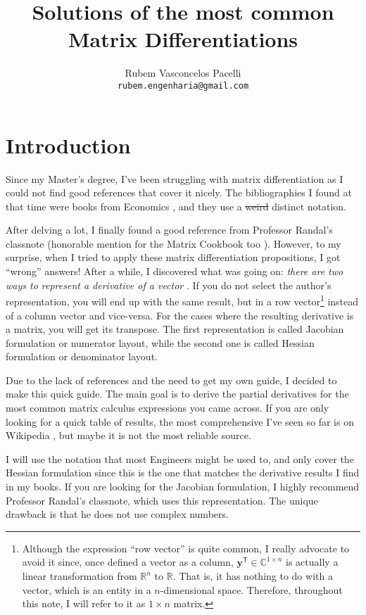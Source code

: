 \documentclass{article}
\title{\textbf{Solutions of the most common Matrix Differentiations}  \vspace{-.3cm}}
\author{Rubem Vasconcelos Pacelli\\
  {\tt rubem.engenharia@gmail.com}}
\affil{Department of Teleinformatics Engineering, Federal University of Ceará.\\Fortaleza, Ceará, Brazil. \vspace{-.5cm}}
\newcommand{\trans}{\mathsf{T}}
\begin{document}
\maketitle
\tableofcontents

\section{Introduction}
Since my Master's degree, I've been struggling with matrix differentiation as I could not find good references that cover it nicely. The bibliographies I found at that time were books from Economics \cite{dhrymes1978mathematics}, and they use a \st{weird} distinct notation.

After delving a lot, I finally found a good reference from Professor Randal's classnote \cite{barnes2006matrix} (honorable mention for the Matrix Cookbook too \cite{petersen2008matrix}). However, to my surprise, when I tried to apply these matrix differentiation propositions, I got ``wrong'' answers! After a while, I discovered what was going on: \emph{there are two ways to represent a derivative of a vector} \cite{Singh}. If you do not select the author's representation, you will end up with the same result, but in a row vector\footnote{Although the expression ``row vector'' is quite common, I really advocate to avoid it since, once defined a vector as a column, \(\mathbf{y}^{\trans} \in \mathbb{C}^{1\times n}\) is actually a linear transformation from \(\mathbb{R}^{n}\) to \(\mathbb{R}\). That is, it has nothing to do with a vector, which is an entity in a \(n\)-dimensional space. Therefore, throughout this note, I will refer to it as \(1\times n\) matrix.} instead of a column vector and vice-versa. For the cases where the resulting derivative is a matrix, you will get its transpose. The first representation is called Jacobian formulation or numerator layout, while the second one is called Hessian formulation or denominator layout.

Due to the lack of references and the need to get my own guide, I decided to make this quick guide. The main goal is to derive the partial derivatives for the most common matrix calculus expressions you came across. If you are only looking for a quick table of results, the most comprehensive I've seen so far is on Wikipedia \cite{Matrixca44:online}, but maybe it is not the most reliable source.

I will use the notation that most Engineers might be used to, and only cover the Hessian formulation since this is the one that matches the derivative results I find in my books. If you are looking for the Jacobian formulation, I highly recommend Professor Randal's classnote, which uses this representation. The unique drawback is that he does not use complex numbers.
\end{document}
